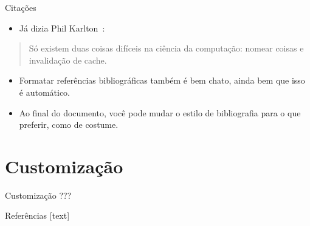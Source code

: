 \documentclass{beamer}
\begin{document}
\begin{frame}{Citações}
    
    \begin{itemize}
        \item Já dizia Phil Karlton~\cite{david2017naming}:
    \end{itemize}
    \begin{quote}
        Só existem duas coisas difíceis na ciência da computação: nomear coisas e invalidação de cache.
    \end{quote}
    \begin{itemize}
        \item Formatar referências bibliográficas também é bem chato, ainda bem que isso é automático.
        \item Ao final do documento, você pode mudar o estilo de bibliografia para o que preferir, como de costume.
    \end{itemize}
    
\end{frame}

\section{Customização}

\begin{frame}{Customização}
    ???
\end{frame}

\miniframesoff
\begin{frame}[allowframebreaks]{Referências}
    [text]
    
    
\end{frame}
\end{document}

